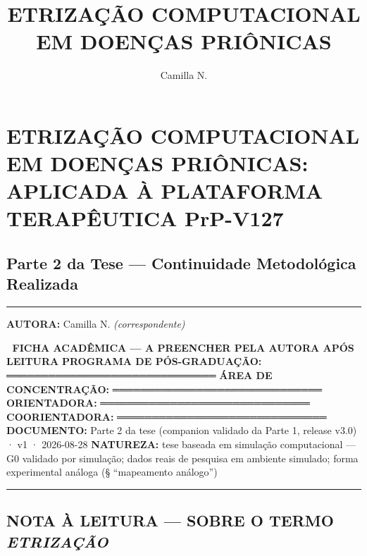 \documentclass[
  10pt,
]{article}
\title{ETRIZAÇÃO COMPUTACIONAL EM DOENÇAS PRIÔNICAS}
\author{Camilla N.}
\date{}
\begin{document}
\maketitle

{
\setcounter{tocdepth}{3}
\tableofcontents
}
\hypertarget{etrizauxe7uxe3o-computacional-em-doenuxe7as-priuxf4nicas-aplicada-uxe0-plataforma-terapuxeautica-prp-v127}{%
\section{ETRIZAÇÃO COMPUTACIONAL EM DOENÇAS PRIÔNICAS: APLICADA À
PLATAFORMA TERAPÊUTICA
PrP-V127}\label{etrizauxe7uxe3o-computacional-em-doenuxe7as-priuxf4nicas-aplicada-uxe0-plataforma-terapuxeautica-prp-v127}}

\hypertarget{parte-2-da-tese-continuidade-metodoluxf3gica-realizada}{%
\subsection{Parte 2 da Tese --- Continuidade Metodológica
Realizada}\label{parte-2-da-tese-continuidade-metodoluxf3gica-realizada}}

\begin{center}\rule{0.5\linewidth}{0.5pt}\end{center}

\textbf{AUTORA:} Camilla N. \emph{(correspondente)}

🔖 \textbf{FICHA ACADÊMICA --- A PREENCHER PELA AUTORA APÓS LEITURA}
\textbf{PROGRAMA DE PÓS-GRADUAÇÃO:} ══════════════════════════════
\textbf{ÁREA DE CONCENTRAÇÃO:} ══════════════════════════════
\textbf{ORIENTADORA:} ══════════════════════════════
\textbf{COORIENTADORA:} ══════════════════════════════
\textbf{DOCUMENTO:} Parte 2 da tese (companion validado da Parte 1,
release v3.0) · v1 · 2026-08-28 \textbf{NATUREZA:} tese baseada em
simulação computacional --- G0 validado por simulação; dados reais de
pesquisa em ambiente simulado; forma experimental análoga (§
``mapeamento análogo'')

\begin{center}\rule{0.5\linewidth}{0.5pt}\end{center}

\hypertarget{nota-uxe0-leitura-sobre-o-termo-etrizauxe7uxe3o}{%
\subsection{\texorpdfstring{NOTA À LEITURA --- SOBRE O TERMO
\emph{ETRIZAÇÃO}}{NOTA À LEITURA --- SOBRE O TERMO ETRIZAÇÃO}}\label{nota-uxe0-leitura-sobre-o-termo-etrizauxe7uxe3o}}
\end{document}
